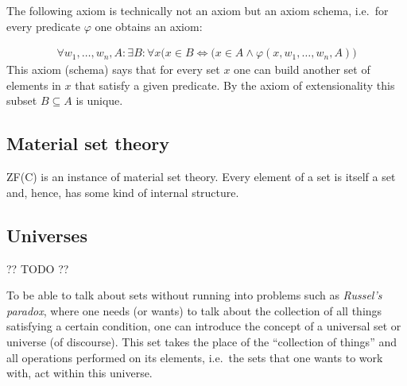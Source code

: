     The following axiom is technically not an axiom but an axiom schema, i.e.~for every predicate $\varphi$ one obtains an axiom:
    \begin{axiom}[Specification]
        \begin{gather}
            \forall w_1,\ldots,w_n,A:\exists B:\forall x\big(x\in B\iff(x\in A\land\varphi(x,w_1,\ldots,w_n,A)\big)
        \end{gather}
        This axiom (schema) says that for every set $x$ one can build another set of elements in $x$ that satisfy a given predicate. By the axiom of extensionality this subset $B\subseteq A$ is unique.
    \end{axiom}

\subsection{Material set theory}

    ZF(C) is an instance of material set theory. Every element of a set is itself a set and, hence, has some kind of internal structure.


\subsection{Universes}\label{section:universes}

    ?? TODO ??

    To be able to talk about sets without running into problems such as \textit{Russel's paradox}, where one needs (or wants) to talk about the collection of all things satisfying a certain condition, one can introduce the concept of a universal set or universe (of discourse). This set takes the place of the ``collection of things'' and all operations performed on its elements, i.e.~the sets that one wants to work with, act within this universe.


